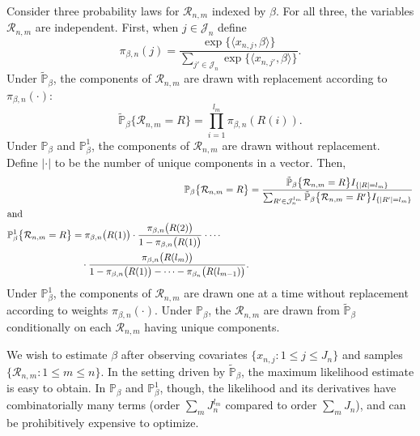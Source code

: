 \documentclass[aoas,preprint]{imsart}
\begin{document}
Consider three probability laws for $\mathcal{R}_{n,m}$ indexed by
$\beta$.  For all three, the variables $\mathcal{R}_{n,m}$ are independent.
First, when $j \in \mathcal{J}_n$ define
\[
    \pi_{\beta, n}(j)
    =
    \frac{\exp\big\{\langle x_{n,j}, \beta \rangle\big\}}
         {\sum_{j' \in \mathcal{J}_n}
            \exp\big\{\langle x_{n,j'}, \beta \rangle\big\}}.
\]
Under $\tilde{\mathbb{P}}_\beta$, the components of $\mathcal{R}_{n,m}$ are
drawn with replacement according to $\pi_{\beta, n}(\cdot)$:
\begin{equation}
    \tilde{\mathbb{P}}_\beta\big\{ \mathcal{R}_{n,m} = R \big\}
    =
    \prod_{i = 1}^{l_m}
        \pi_{\beta, n}(R(i)).
\end{equation}
Under $\mathbb{P}_\beta$ and $\mathbb{P}^1_\beta$, the components
of $\mathcal{R}_{n,m}$ are drawn without replacement.  Define
$|\cdot|$ to be the number of unique components in a vector.  Then,
\begin{align}
    \mathbb{P}_\beta\big\{ \mathcal{R}_{n,m} = R \big\}
        &=
        \frac{
            \tilde{\mathbb{P}}_\beta\big\{ \mathcal{R}_{n,m} = R \big\}
            I_{\{|R| = l_m\}}
        }{
            \sum_{R' \in \mathcal{J}_n^{l_m}}
                \tilde{\mathbb{P}}_\beta\big\{ \mathcal{R}_{n,m} = R' \big\}
                I_{\{|R'| = l_m\}}                
        } \\
\intertext{and}
    \begin{split}
    \mathbb{P}^1_\beta\big\{ \mathcal{R}_{n,m} = R \big\}
        &=
        \pi_{\beta,n}\big(R(1)\big)
        \cdot
        \frac{
            \pi_{\beta,n}\big(R(2)\big)
        }{
            1 - \pi_{\beta,n}\big(R(1)\big)
        }
        \cdot
        \cdots \\
        &\quad\cdot
        \frac{
            \pi_{\beta,n}\big(R(l_m)\big)
        }{
            1 - \pi_{\beta,n}\big(R(1)\big)
            - \cdots - \pi_{\beta_n}\big(R(l_{m-1})\big)
        }.
    \end{split}
\end{align}
Under $\mathbb{P}^1_\beta$, the components of $\mathcal{R}_{n,m}$ are drawn
one at a time without replacement according to weights $\pi_{\beta,n}(\cdot)$.
Under $\mathbb{P}_\beta$, the $\mathcal{R}_{n,m}$ are drawn from
$\tilde{\mathbb{P}}_\beta$ conditionally on each $\mathcal{R}_{n,m}$ having
unique components.

We wish to estimate $\beta$ after observing covariates
$\{ x_{n,j} : 1 \leq j \leq J_n \}$ and samples
$\{\mathcal{R}_{n,m} : 1 \leq m \leq n\}$.  In the setting driven by
$\tilde{\mathbb{P}}_\beta$, the maximum likelihood estimate is easy to
obtain.  In $\mathbb{P}_\beta$ and $\mathbb{P}^1_\beta$, though, the
likelihood and its derivatives have combinatorially many terms
(order $\sum_m J_n^{l_m}$ compared to order $\sum_m J_n$), and can be
prohibitively expensive to optimize.
\end{document}
